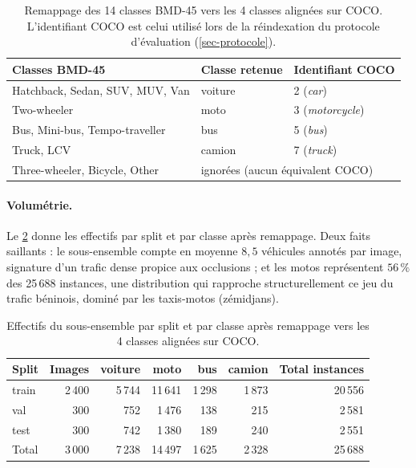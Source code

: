 \begin{table}[tb]
  \centering
  \caption{Remappage des 14 classes BMD-45 vers les 4 classes alignées
  sur COCO. L'identifiant COCO est celui utilisé lors de la réindexation
  du protocole d'évaluation (\cref{sec-protocole}).}
  \label{tab-remappage}
  \begin{tabular}{lll}
    \toprule
    Classes BMD-45 & Classe retenue & Identifiant COCO \\
    \midrule
    Hatchback, Sedan, SUV, MUV, Van & voiture & 2 (\emph{car}) \\
    Two-wheeler                     & moto    & 3 (\emph{motorcycle}) \\
    Bus, Mini-bus, Tempo-traveller  & bus     & 5 (\emph{bus}) \\
    Truck, LCV                      & camion  & 7 (\emph{truck}) \\
    \midrule
    Three-wheeler, Bicycle, Other   & \multicolumn{2}{l}{ignorées (aucun équivalent COCO)} \\
    \bottomrule
  \end{tabular}
\end{table}

\paragraph{Volumétrie.}
Le \cref{tab-volumetrie} donne les effectifs par split et par classe
après remappage. Deux faits saillants : le sous-ensemble compte en
moyenne $8{,}5$ véhicules annotés par image, signature d'un trafic dense
propice aux occlusions ; et les motos représentent $56\,\%$ des
25\,688 instances, une distribution qui rapproche structurellement ce jeu
du trafic béninois, dominé par les taxis-motos (zémidjans).

\begin{table}[tb]
  \centering
  \caption{Effectifs du sous-ensemble par split et par classe après
  remappage vers les 4 classes alignées sur COCO.}
  \label{tab-volumetrie}
  \begin{tabular}{lrrrrrr}
    \toprule
    Split & Images & voiture & moto & bus & camion & Total instances \\
    \midrule
    train & 2\,400 & 5\,744 & 11\,641 & 1\,298 & 1\,873 & 20\,556 \\
    val   & 300    & 752    & 1\,476  & 138    & 215    & 2\,581  \\
    test  & 300    & 742    & 1\,380  & 189    & 240    & 2\,551  \\
    \midrule
    Total & 3\,000 & 7\,238 & 14\,497 & 1\,625 & 2\,328 & 25\,688 \\
    \bottomrule
  \end{tabular}
\end{table}


